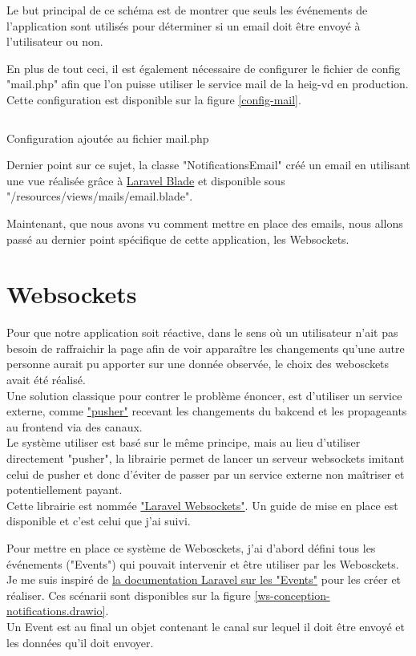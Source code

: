 \documentclass[
    iai, %
    il, %
]{heig-tb}
\begin{document}
Le but principal de ce schéma est de montrer que seuls les événements de l'application sont utilisés pour déterminer si un email doit être envoyé à l'utilisateur ou non.

En plus de tout ceci, il est également nécessaire de configurer le fichier de config "mail.php" afin que l'on puisse utiliser le service mail de la \Gls{heig-vd} en production. Cette configuration est disponible sur la figure \ref{config-mail}.

\begin{listing}[h]
    \inputminted{php}{assets/code/mail.php}
    \caption{Configuration ajoutée au fichier mail.php \label{config-mail}}
\end{listing}

Dernier point sur ce sujet, la classe "NotificationsEmail" créé un email en utilisant une vue réalisée grâce à \href{https://laravel.com/docs/9.x/blade}{Laravel Blade} et disponible sous "/resources/views/mails/email.blade".

Maintenant, que nous avons vu comment mettre en place des emails, nous allons passé au dernier point spécifique de cette application, les Websockets.

\section{Websockets}
Pour que notre application soit réactive, dans le sens où un utilisateur n'ait pas besoin de raffraichir la page afin de voir apparaître les changements qu'une autre personne aurait pu apporter sur une donnée observée, le choix des webosckets avait été réalisé. \\
Une solution classique pour contrer le problème énoncer, est d'utiliser un service externe, comme \href{https://pusher.com/}{"pusher"} recevant les changements du bakcend et les propageants au frontend via des canaux. \\
Le système utiliser est basé sur le même principe, mais au lieu d'utiliser directement "pusher", la librairie permet de lancer un serveur websockets imitant celui de pusher et donc d'éviter de passer par un service externe non maîtriser et potentiellement payant. \\
Cette librairie est nommée \href{https://beyondco.de/docs/laravel-websockets/getting-started/introduction}{"Laravel Websockets"}. Un guide de mise en place est disponible et c'est celui que j'ai suivi.

Pour mettre en place ce système de Webosckets, j'ai d'abord défini tous les événements ("Events") qui pouvait intervenir et être utiliser par les Webosckets. Je me suis inspiré de \href{https://laravel.com/docs/9.x/events}{la documentation Laravel sur les "Events"} pour les créer et réaliser.
Ces scénarii sont disponibles sur la figure \ref{ws-conception-notifications.drawio}. \\
Un Event est au final un objet contenant le canal sur lequel il doit être envoyé et les données qu'il doit envoyer.
\end{document}

